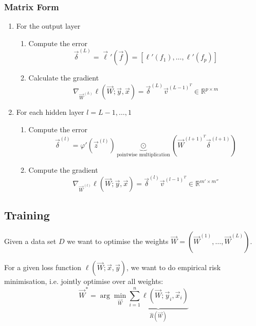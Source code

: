 \subsubsection{Matrix Form}
\begin{enumerate}
    \item For the output layer
    \begin{enumerate}
        \item Compute the error
        \begin{equation*}
            \vec{\delta}^{(L)}
            = \vec{\ell}'(\vec{f})
            = [\ell'(f_1), \dotsc, \ell'(f_p)]
        \end{equation*}
        \item Calculate the gradient
        \begin{equation*}
            \nabla_{\vec{W}^{(L)}} \ell(\vec{W}; \vec{y}, \vec{x})
            = \vec{\delta}^{(L)} \vec{v}^{(L-1)^T}
                \in \mathbb{R}^{p \times m}
        \end{equation*}
    \end{enumerate}
    
    \item For each hidden layer $l = L - 1, \dotsc, 1$
    \begin{enumerate}
        \item Compute the error
        \begin{equation*}
            \vec{\delta}^{(l)}
            = \varphi'(\vec{z}^{(l)}) \underbrace{\odot}_{\text{pointwise multiplication}} 
            (\vec{W}^{(l + 1)^T} \vec{\delta}^{(l + 1)})
        \end{equation*}
        \item Compute the gradient
        \begin{equation*}
            \nabla_{\vec{W}^{(l)}} \ell(\vec{W}; \vec{y}, \vec{x})
            = \vec{\delta}^{(l)} \vec{v}^{(l-1)^T}
            \in \mathbb{R}^{m' \times m''}        
        \end{equation*}
    \end{enumerate}
\end{enumerate}


\subsection{Training}
Given a data set $D$ we want to optimise the weights
$\vec{W} = (\vec{W}^{(1)}, \dotsc, \vec{W}^{(L)})$.

For a given loss function $\ell(\vec{W}; \vec{x}, \vec{y})$,
we want to do empirical risk minimisation,
i.e. jointly optimise over all weights:
\begin{equation*}
    \vec{W}^*
    = \arg\min_{\vec{W}}{
        \underbrace{
            \sum_{i=1}^n{\ell(\vec{W}; \vec{y}_i, \vec{x}_i)}
        }_{\hat{R}(\vec{W})}
    }
\end{equation*}

